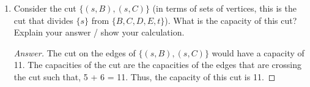 \documentclass[11pt]{article}
\theoremstyle{definition}
\theoremstyle{definition}
\theoremstyle{definition}
\begin{document}
\begin{enumerate}
\vfill
\item Consider the cut $\{(s,B), (s,C)\}$ (in terms of sets of vertices, this is the cut that divides $\{s\}$ from $\{B,C,D,E,t\}$). What is the capacity of this cut? Explain your answer / show your calculation.

\begin{proof}[Answer]
The cut on the edges of $\{(s,B), (s,C)\}$ would have a capacity of 11. The capacities of the cut are the capacities of the edges that are crossing the cut such that, 5 + 6 = 11. Thus, the capacity of this cut is 11.
\end{proof}
\vfill

\end{enumerate}


\end{document}
